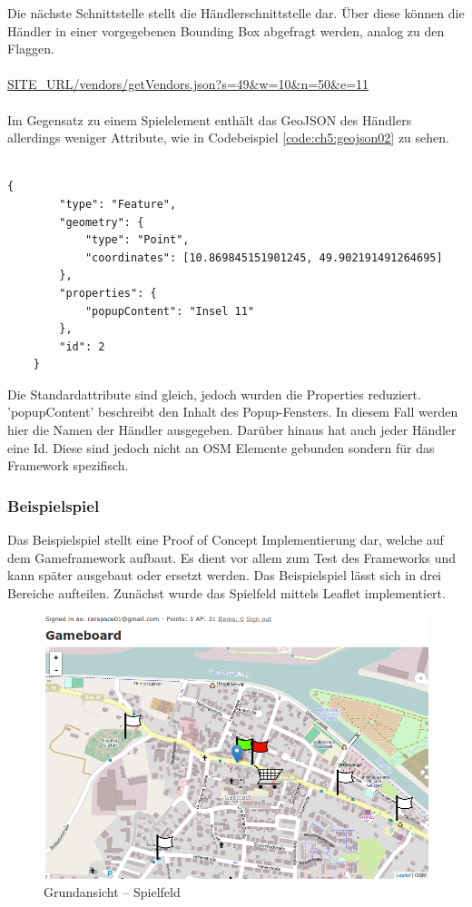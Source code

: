 Die nächste Schnittstelle stellt die Händlerschnittstelle dar. Über diese können die Händler in einer vorgegebenen Bounding Box abgefragt werden, analog zu den Flaggen.
\\\\
\url{SITE\_URL/vendors/getVendors.json?s=49&w=10&n=50&e=11}
\\\\
Im Gegensatz zu einem Spielelement enthält das GeoJSON des Händlers allerdings weniger Attribute, wie in Codebeispiel \ref{code:ch5:geojson02} zu sehen.
\\\\
\begin{lstlisting}[caption=GeoJSON Response Vendor (Reduziert), label=code:ch5:geojson02]
{
        "type": "Feature",
        "geometry": {
            "type": "Point",
            "coordinates": [10.869845151901245, 49.902191491264695]
        },
        "properties": {
            "popupContent": "Insel 11"
        },
        "id": 2
    }
\end{lstlisting}

Die Standardattribute sind gleich, jedoch wurden die Properties reduziert. 'popupContent' beschreibt den Inhalt des Popup-Fensters. In diesem Fall werden hier die Namen der Händler ausgegeben. Darüber hinaus hat auch jeder Händler eine Id. Diese sind jedoch nicht an OSM Elemente gebunden sondern für das Framework spezifisch.

\subsubsection*{Beispielspiel}

Das Beispielspiel stellt eine Proof of Concept Implementierung dar, welche auf dem Gameframework aufbaut. Es dient vor allem zum Test des Frameworks und kann später ausgebaut oder ersetzt werden. Das Beispielspiel lässt sich in drei Bereiche aufteilen. Zunächst wurde das Spielfeld mittels Leaflet implementiert.

\begin{figure}[H]
\begin{center}
\includegraphics[width=150mm]{images/ch5_img09_gameboard.png}
\caption{Grundansicht -- Spielfeld}
\label{img:ch5_img09_gameboard}
\end{center}
\end{figure}


